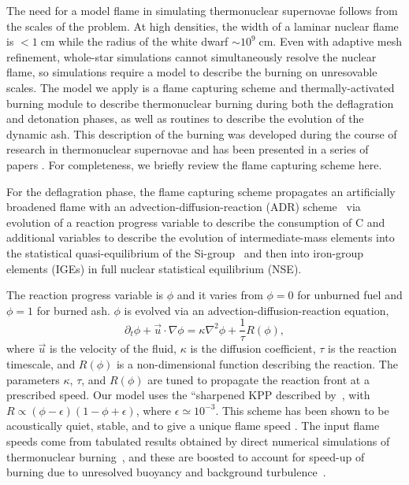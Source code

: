 \documentclass[iop,apj]{emulateapj}
\newcommand{\pv}{\ensuremath{\phi}}
\begin{document}
The need for a model flame in simulating thermonuclear supernovae follows 
from the scales of the problem. At high densities, the width of a laminar 
nuclear flame is $< 1\ensuremath{\;}{\ensuremath{\mathrm{cm}}}$ while the 
radius of the white dwarf $\sim 10^9\ensuremath{\;}{\ensuremath{\mathrm{cm}}}$.
Even with adaptive mesh refinement, whole-star simulations cannot 
simultaneously resolve the nuclear flame, so simulations require a model to 
describe the burning on unresovable scales.  The model we apply is a flame 
capturing scheme and thermally-activated burning module to describe
thermonuclear burning during both the deflagration and detonation phases, 
as well as routines to describe the evolution of the dynamic ash. 
This description of the burning was developed during the course of research in 
thermonuclear supernovae and has been presented in a series of 
papers \citep[See][and references therein]{chandlery}. For completeness, 
we briefly review the flame capturing scheme here.

For the deflagration phase, the flame capturing scheme propagates an 
artificially broadened flame with an advection-diffusion-reaction (ADR)
scheme~\cite{Khok95,VladWeirRyzh06} via evolution of
a reaction progress variable to describe the consumption of C
and additional variables to describe the evolution of intermediate-mass
elements into the statistical quasi-equilibrium of the 
Si-group~\cite{ifk1981,khok1981,khok1983} and then into iron-group elements
(IGEs) in full nuclear statistical equilibrium (NSE).

The reaction progress variable is $\phi$ and it varies from $\phi=0$ for
unburned fuel and $\phi=1$ for burned ash. $\phi$ is evolved
via an advection-diffusion-reaction equation,
\begin{equation}
  \label{eq:ard}
  \partial_t \pv + \vec{u}\cdot\nabla \pv = \kappa \nabla^2 \pv +
\frac{1}{\tau} R\left(\phi\right) ,
\end{equation}
where $\vec{u}$ is the velocity of the fluid, $\kappa$ is the
diffusion coefficient, $\tau$ is the reaction timescale, and $R(\phi)$ is
a non-dimensional function describing the reaction. The parameters
$\kappa$, $\tau$, and $R(\phi)$ are tuned to propagate the reaction
front at a prescribed speed.  Our model uses the ``sharpened KPP
 described by~\cite{VladWeirRyzh06}, 
with $R\propto(\phi-\epsilon)(1-\phi+\epsilon)$, where
$\epsilon \simeq 10^{-3}$.  This scheme has been shown to be
acoustically quiet, stable, and to give a unique flame speed
\cite{townsley.calder.ea:flame}. The input flame speeds come from
tabulated results obtained by direct numerical simulations of
thermonuclear burning~\cite{timmes92,Chamulak2007The-Laminar-Fla},
and 
these are boosted to account for speed-up of burning due to unresolved 
buoyancy and background turbulence~\cite{Khok95,
gamezo.khokhlov.ea:thermonuclear,townsley.calder.ea:flame,jacketal2014}.
\end{document}
